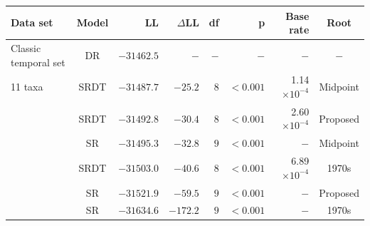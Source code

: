 
    \begin{tabular}{lcrrrrrc}
    Data set & Model & LL & $\Delta$LL & df & p & Base rate & Root  \\ 
\toprule
Classic temporal set & DR & $−31462.5$ & $- $ & $- $ & $-$ & $-$ & $-$ \\ 
11 taxa & SRDT & $−31487.7$ & $−25.2 $ & $8 $ & $<0.001$ & 1.14$ \times 10^{-4}$ & Midpoint \\ 
  & SRDT & $−31492.8$ & $−30.4 $ & $8 $ & $<0.001$ & 2.60$ \times 10^{-4}$ & Proposed \\ 
  & SR & $−31495.3$ & $−32.8 $ & $9 $ & $<0.001$ & $-$ & Midpoint \\ 
  & SRDT & $−31503.0$ & $−40.6 $ & $8 $ & $<0.001$ & 6.89$ \times 10^{-4}$ & 1970s \\ 
  & SR & $−31521.9$ & $−59.5 $ & $9 $ & $<0.001$ & $-$ & Proposed \\ 
  & SR & $−31634.6$ & $−172.2 $ & $9 $ & $<0.001$ & $-$ & 1970s \\ 
\bottomrule
\end{tabular}
